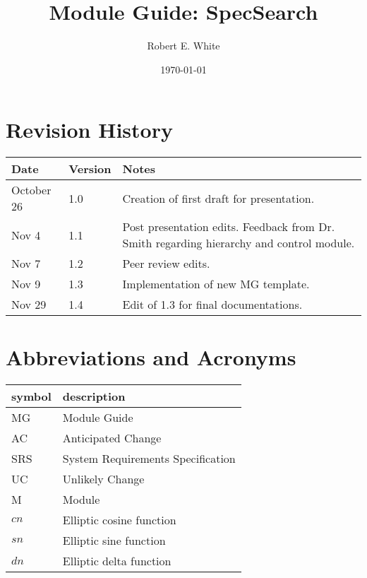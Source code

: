 \documentclass[12pt, titlepage]{article}
\begin{document}
	
	\title{Module Guide: SpecSearch} 
	\author{Robert E. White}
	\date{\today}
	
	\maketitle
	\section{Revision History}
	
	\begin{tabularx}{\textwidth}{p{3cm}p{2cm}X}
		\toprule {\bf Date} & {\bf Version} & {\bf Notes}\\
		\midrule
		October 26 & 1.0 & Creation of first draft for presentation.\\ 
		Nov 4 & 1.1 & Post presentation edits. Feedback from Dr. Smith 
		regarding 
		hierarchy and control module.\\
		Nov 7 & 1.2 & Peer review edits. \\ 
		Nov 9 & 1.3 & Implementation of new MG template. \\ 
		Nov 29& 1.4 & Edit of 1.3 for final documentations.\\
		\bottomrule
	\end{tabularx}
	
	\newpage
	
	\tableofcontents
	
	\listoftables
	
	\listoffigures
	\section*{Abbreviations and Acronyms}
	
	\renewcommand{\arraystretch}{1.2}
	\begin{tabular}{l l} 
		\toprule		
		\textbf{symbol} & \textbf{description}\\
		\midrule 
		MG & Module Guide\\
		AC & Anticipated Change\\ 
		SRS & System Requirements Specification\\ 
		UC & Unlikely Change\\
		M & Module\\ 
		$cn$ & Elliptic cosine function\\ 
		$sn$ & Elliptic sine function\\ 
		$dn$ & Elliptic delta function \\ 
		\bottomrule
	\end{tabular}\\
	
\end{document}
